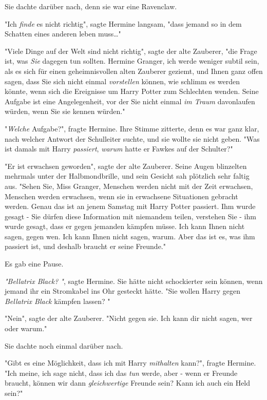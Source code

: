 {Sie dachte darüber nach, denn sie war eine Ravenclaw.

"Ich \emph{finde} es nicht richtig", sagte Hermine langsam, "dass jemand so in dem Schatten eines anderen leben muss…"

"Viele Dinge auf der Welt sind nicht richtig", sagte der alte Zauberer, "die Frage ist, was \emph{Sie} dagegen tun sollten. Hermine Granger, ich werde weniger subtil sein, als es sich für einen geheimnisvollen alten Zauberer geziemt, und Ihnen ganz offen sagen, dass Sie sich nicht einmal \emph{vorstellen} können, wie schlimm es werden könnte, wenn sich die Ereignisse um Harry Potter zum Schlechten wenden. Seine Aufgabe ist eine Angelegenheit, vor der Sie nicht einmal \emph{im Traum} davonlaufen würden, wenn Sie sie kennen würden."

"\emph{Welche} Aufgabe?", fragte Hermine. Ihre Stimme zitterte, denn es war ganz klar, nach welcher Antwort der Schulleiter suchte, und sie wollte sie nicht geben. "Was ist damals mit Harry \emph{passiert}, \emph{warum} hatte er Fawkes auf der Schulter?"

"Er ist erwachsen geworden", sagte der alte Zauberer. Seine Augen blinzelten mehrmals unter der Halbmondbrille, und sein Gesicht sah plötzlich sehr faltig aus. "Sehen Sie, Miss Granger, Menschen werden nicht mit der Zeit erwachsen, Menschen werden erwachsen, wenn sie in erwachsene Situationen gebracht werden. Genau das ist an jenem Samstag mit Harry Potter passiert. Ihm wurde gesagt - Sie dürfen diese Information mit niemandem teilen, verstehen Sie - ihm wurde gesagt, dass er gegen jemanden kämpfen müsse. Ich kann Ihnen nicht sagen, gegen wen. Ich kann Ihnen nicht sagen, warum. Aber das ist es, was ihm passiert ist, und deshalb braucht er seine Freunde."

Es gab eine Pause.

\emph{"Bellatrix Black? "}, sagte Hermine. Sie hätte nicht schockierter sein können, wenn jemand ihr ein Stromkabel ins Ohr gesteckt hätte. "Sie wollen Harry gegen \emph{Bellatrix Black} kämpfen lassen? "

"Nein", sagte der alte Zauberer. "Nicht gegen sie. Ich kann dir nicht sagen, wer oder warum."

Sie dachte noch einmal darüber nach.

"Gibt es eine Möglichkeit, dass ich mit Harry \emph{mithalten} kann?", fragte Hermine. "Ich meine, ich sage nicht, dass ich das \emph{tun} werde, aber - wenn er Freunde braucht, können wir dann \emph{gleichwertige} Freunde sein? Kann ich auch ein Held sein?"

}
